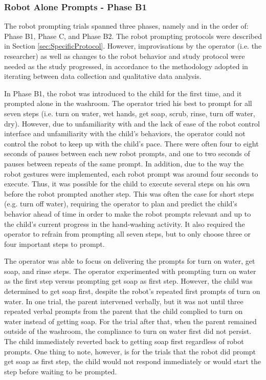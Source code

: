 \documentclass{ut-thesis}
\begin{document}
\subsubsection{Robot Alone Prompts - Phase B1}
The robot prompting trials spanned three phases, namely and in the order of: Phase B1, Phase C, and Phase B2.  The robot prompting protocols were described in Section \ref{sec:SpecificProtocol}.  However, improvisations by the operator (i.e. the researcher) as well as changes to the robot behavior and study protocol were needed as the study progressed, in accordance to the methodology adopted in iterating between data collection and qualitative data analysis.

In Phase B1, the robot was introduced to the child for the first time, and it prompted alone in the washroom.  The operator tried his best to prompt for all seven steps (i.e. turn on water, wet hands, get soap, scrub, rinse, turn off water, dry).  However, due to unfamiliarity with and the lack of ease of the robot control interface and unfamiliarity with the child's behaviors, the operator could not control the robot to keep up with the child's pace.  There were often four to eight seconds of pauses between each new robot prompts, and one to two seconds of pauses between repeats of the same prompt.  In addition, due to the way the robot gestures were implemented, each robot prompt was around four seconds to execute.  Thus, it was possible for the child to execute several steps on his own before the robot prompted another step.  This was often the case for short steps (e.g. turn off water), requiring the operator to plan and predict the child's behavior ahead of time in order to make the robot prompts relevant and up to the child's current progress in the hand-washing activity.  It also required the operator to refrain from prompting all seven steps, but to only choose three or four important steps to prompt.

The operator was able to focus on delivering the prompts for turn on water, get soap, and rinse steps.  The operator experimented with prompting turn on water as the first step versus prompting get soap as first step.  However, the child was determined to get soap first, despite the robot's repeated first prompts of turn on water.  In one trial, the parent intervened verbally, but it was not until three repeated verbal prompts from the parent that the child complied to turn on water instead of getting soap.  For the trial after that, when the parent remained outside of the washroom, the compliance to turn on water first did not persist.  The child immediately reverted back to getting soap first regardless of robot prompts.  One thing to note, however, is for the trials that the robot did prompt get soap as first step, the child would not respond immediately or would start the step before waiting to be prompted.
\end{document}
